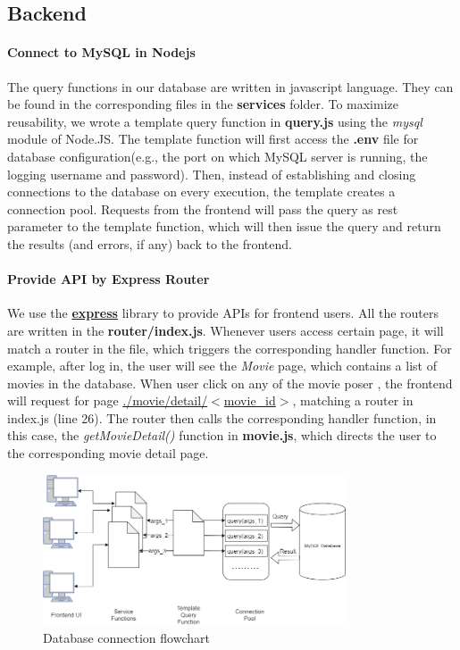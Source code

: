 \begin{CJK*}{UTF8}{gbsn}
\subsection{Backend}
\paragraph{Connect to MySQL in Nodejs}
The query functions in our database are written in javascript language. They can be found in the corresponding files in the \textbf{services} folder. To maximize reusability, we wrote a template query function in \textbf{query.js} using the \textit{mysql} module of Node.JS. The template function will first access the \textbf{.env} file for database configuration(e.g., the port on which MySQL server is running, the logging username and password). Then, instead of establishing and closing connections to the database on every execution, the template creates a connection pool. Requests from the frontend will pass the query as rest parameter to the template function, which will then issue the query and return the results (and errors, if any) back to the frontend.
\paragraph{Provide API by Express Router}
We use the \textbf{\href{https://expressjs.com}{express}} library to provide APIs for frontend users. All the routers are written in the \textbf{router/index.js}. Whenever users access certain page, it will match a router in the file, which triggers the corresponding handler function. For example, after log in, the user will see the \textit{Movie} page, which contains a list of movies in the database. When user click on any of the movie poser , the frontend will request for page \underline{./movie/detail/$<$movie\_id$>$}, matching a router in index.js (line 26). The router then calls the corresponding handler function, in this case, the \textit{getMovieDetail()} function in \textbf{movie.js}, which directs the user to the corresponding movie detail page.
\begin{figure}[h]
    \centering
    \includegraphics[width=0.8\textwidth]{sqlconnect.png}
    \caption{Database connection flowchart}
\end{figure}

\end{CJK*}
